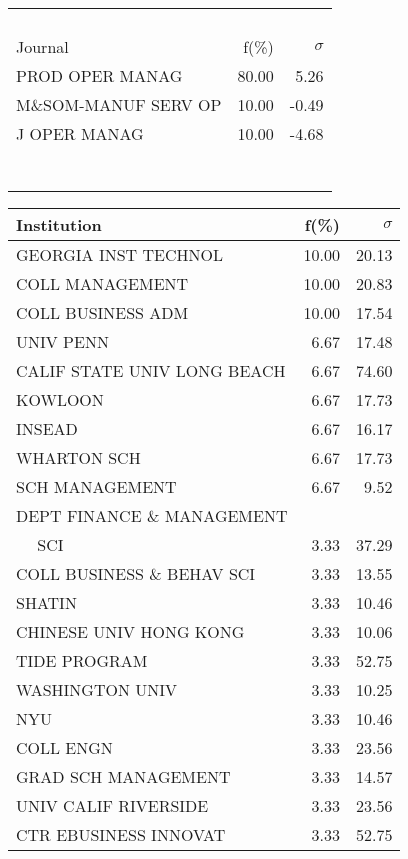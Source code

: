 \documentclass[a4paper,11pt]{report}
\begin{document}
\begin{landscape}
\begin{table}[!ht]
{\begin{tabular}{|l r r|}
 &  & \\
 &  & \\
 &  & \\
 &  & \\
\hline
\hline
Journal & f(\%) & $\sigma$\\
\hline
PROD OPER MANAG & 80.00 & 5.26\\
M\&SOM-MANUF SERV OP & 10.00 & -0.49\\
J OPER MANAG & 10.00 & -4.68\\
 &  & \\
 &  & \\
 &  & \\
 &  & \\
 &  & \\
 &  & \\
 &  & \\
\hline
\end{tabular}
}
{\scriptsize\begin{tabular}{|l r r|}
\hline
Institution & f(\%) & $\sigma$\\
\hline
GEORGIA INST TECHNOL & 10.00 & 20.13\\
COLL MANAGEMENT & 10.00 & 20.83\\
COLL BUSINESS ADM & 10.00 & 17.54\\
UNIV PENN & 6.67 & 17.48\\
CALIF STATE UNIV LONG BEACH & 6.67 & 74.60\\
KOWLOON & 6.67 & 17.73\\
INSEAD & 6.67 & 16.17\\
WHARTON SCH & 6.67 & 17.73\\
SCH MANAGEMENT & 6.67 & 9.52\\
DEPT FINANCE \& MANAGEMENT &  & \\
$\quad$ SCI & 3.33 & 37.29\\
COLL BUSINESS \& BEHAV SCI & 3.33 & 13.55\\
SHATIN & 3.33 & 10.46\\
CHINESE UNIV HONG KONG & 3.33 & 10.06\\
TIDE PROGRAM & 3.33 & 52.75\\
WASHINGTON UNIV & 3.33 & 10.25\\
NYU & 3.33 & 10.46\\
COLL ENGN & 3.33 & 23.56\\
GRAD SCH MANAGEMENT & 3.33 & 14.57\\
UNIV CALIF RIVERSIDE & 3.33 & 23.56\\
CTR EBUSINESS INNOVAT & 3.33 & 52.75\\

\end{tabular}}
\end{table}
\end{landscape}
\end{document}
